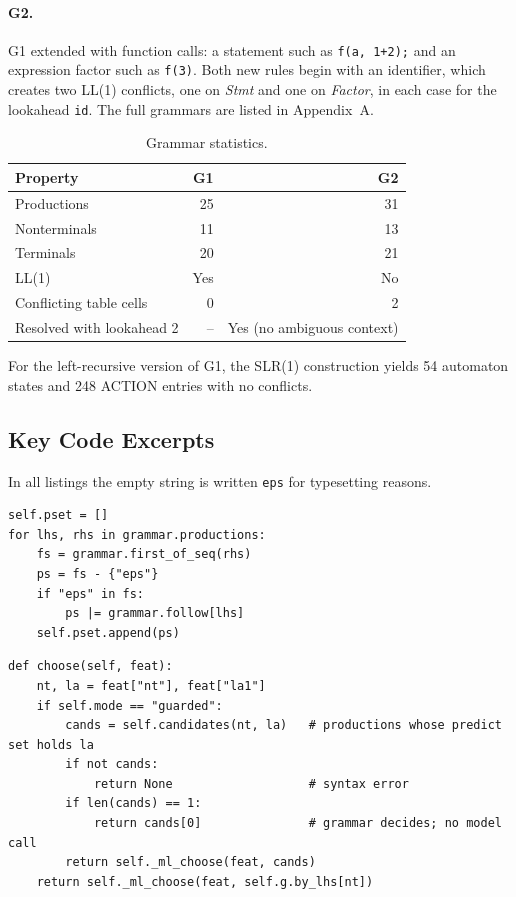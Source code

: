 \documentclass[12pt,a4paper]{article}
\newcommand{\ntm}[1]{\textit{#1}}
\newcommand{\tok}[1]{\texttt{#1}}
\begin{document}
\paragraph{G2.} G1 extended with function calls: a statement such as
\tok{f(a, 1+2);} and an expression factor such as \tok{f(3)}. Both new rules begin
with an identifier, which creates two LL(1) conflicts, one on \ntm{Stmt} and one
on \ntm{Factor}, in each case for the lookahead \tok{id}. The full grammars are
listed in Appendix~A.

\begin{table}[H]
\centering
\caption{Grammar statistics.}
\label{tab:grammars}
\begin{tabular}{lrr}
\toprule
\textbf{Property} & \textbf{G1} & \textbf{G2}\\
\midrule
Productions & 25 & 31\\
Nonterminals & 11 & 13\\
Terminals & 20 & 21\\
LL(1) & Yes & No\\
Conflicting table cells & 0 & 2\\
Resolved with lookahead 2 & -- & Yes (no ambiguous context)\\
\bottomrule
\end{tabular}
\end{table}

\noindent For the left-recursive version of G1, the SLR(1) construction yields 54
automaton states and 248 ACTION entries with no conflicts.

\subsection{Key Code Excerpts}

In all listings the empty string is written \texttt{eps} for typesetting reasons.

\begin{lstlisting}[caption={Predict sets, computed once when the parser is created (ml\_parser.py).}]
self.pset = []
for lhs, rhs in grammar.productions:
    fs = grammar.first_of_seq(rhs)
    ps = fs - {"eps"}
    if "eps" in fs:
        ps |= grammar.follow[lhs]
    self.pset.append(ps)
\end{lstlisting}

\begin{lstlisting}[caption={The decision procedure of the guarded parser (ml\_parser.py).}]
def choose(self, feat):
    nt, la = feat["nt"], feat["la1"]
    if self.mode == "guarded":
        cands = self.candidates(nt, la)   # productions whose predict set holds la
        if not cands:
            return None                   # syntax error
        if len(cands) == 1:
            return cands[0]               # grammar decides; no model call
        return self._ml_choose(feat, cands)
    return self._ml_choose(feat, self.g.by_lhs[nt])
\end{lstlisting}
\end{document}

